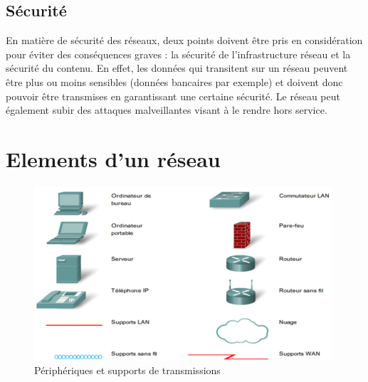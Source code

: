\documentclass[11pt]{article}
\begin{document}
\subsection{Sécurité}
En matière de sécurité des réseaux, deux points doivent être pris en considération pour éviter des conséquences graves : la sécurité de l'infrastructure réseau et la sécurité du contenu.
En effet, les données qui transitent sur un réseau peuvent être plus ou moins sensibles (données bancaires par exemple) et doivent donc pouvoir être transmises en garantissant une certaine sécurité.
Le réseau peut également subir des attaques malveillantes visant à le rendre hors service.
\section{Elements d'un réseau}
\begin{figure}[h!t]
  \centering
  \includegraphics[height=.3\textheight]{Src/Images/reseau_peripheriques}
  \caption{Périphériques et supports de transmissions}
\end{figure}
\end{document}
